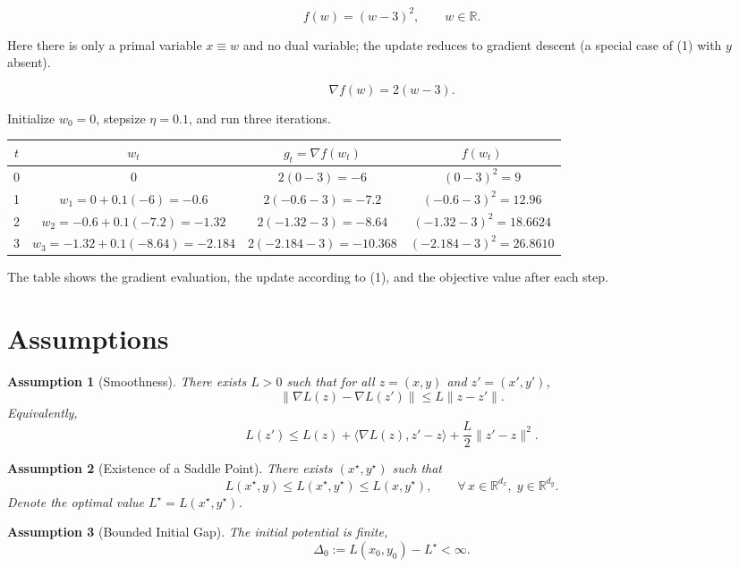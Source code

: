 \documentclass{article}
\newtheorem{assumption}{Assumption}
\begin{document}
\[
f(w)= (w-3)^2 ,\qquad w\in\mathbb{R}.
\]

Here there is only a primal variable $x\equiv w$ and no dual variable; the
update reduces to gradient descent (a special case of (1) with $y$ absent).

\[
\nabla f(w)=2(w-3).
\]

Initialize $w_0=0$, stepsize $\eta=0.1$, and run three iterations.

\begin{center}
\begin{tabular}{c|c|c|c}
$t$ & $w_t$ & $\displaystyle g_t=\nabla f(w_t)$ & $f(w_t)$\\ \hline
0 & $0$ & $2(0-3)=-6$ & $(0-3)^2=9$\\
1 & $w_1 = 0 + 0.1(-6)= -0.6$ & $2(-0.6-3)=-7.2$ & $(-0.6-3)^2 = 12.96$\\
2 & $w_2 = -0.6 + 0.1(-7.2)= -1.32$ & $2(-1.32-3)=-8.64$ & $(-1.32-3)^2 = 18.6624$\\
3 & $w_3 = -1.32 + 0.1(-8.64)= -2.184$ & $2(-2.184-3)=-10.368$ & $(-2.184-3)^2 = 26.8610$
\end{tabular}
\end{center}

The table shows the gradient evaluation, the update according to (1), and the
objective value after each step.

\newpage

\section*{Assumptions}
\begin{assumption}[Smoothness]\label{as:smooth}
There exists $L>0$ such that for all $z=(x,y)$ and $z'=(x',y')$,
\[
\big\|\nabla L(z)-\nabla L(z')\big\| \le L\|z-z'\|.
\]
Equivalently,
\[
L(z')\le L(z)+\langle\nabla L(z),z'-z\rangle+\frac{L}{2}\|z'-z\|^{2}.
\tag{2}
\]
\end{assumption}

\begin{assumption}[Existence of a Saddle Point]\label{as:saddle}
There exists $(x^{\star},y^{\star})$ such that
\[
L(x^{\star},y)\le L(x^{\star},y^{\star})\le L(x,y^{\star}),\qquad
\forall\,x\in\mathbb{R}^{d_x},\;y\in\mathbb{R}^{d_y}.
\]
Denote the optimal value $L^{\star}=L(x^{\star},y^{\star})$.
\end{assumption}

\begin{assumption}[Bounded Initial Gap]\label{as:gap}
The initial potential is finite,
\[
\Delta_0:=L(x_0,y_0)-L^{\star}<\infty .
\]
\end{assumption}
\end{document}

